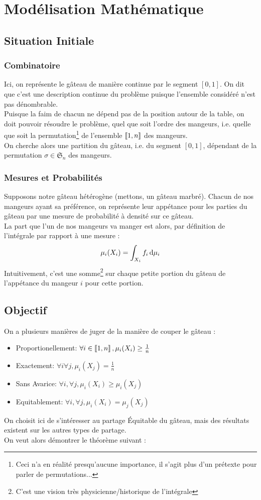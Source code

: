 \documentclass{cours}
\begin{document}
\section{Modélisation Mathématique}
\subsection{Situation Initiale}
\subsubsection{Combinatoire}
Ici, on représente le gâteau de manière continue par le segment $\left[0, 1\right]$. On dit que c'est une description continue du problème puisque l'ensemble considéré n'est pas dénombrable.\\
Puisque la faim de chacun ne dépend pas de la position autour de la table, on doit pouvoir résoudre le problème, quel que soit l'ordre des mangeurs, i.e. quelle que soit la permutation\footnote{Ceci n'a en réalité presqu'aucune importance, il s'agit plus d'un prétexte pour parler de permutations...} de l'ensemble $\left\llbracket 1, n\right\rrbracket$ des mangeurs. \\
On cherche alors une partition du gâteau, i.e. du segment $\left[0, 1\right]$, dépendant de la permutation $\sigma \in \mathfrak{S}_{n}$ des mangeurs.

\subsubsection{Mesures et Probabilités}
Supposons notre gâteau hétérogène (mettons, un gâteau marbré). Chacun de nos mangeurs ayant sa préférence, on représente leur appétance pour les parties du gâteau par une mesure de probabilité à densité sur ce gâteau.\\
La part que l'un de nos mangeurs va manger est alors, par définition de l'intégrale par rapport à une mesure :
\[
    \mu_{i}(X_{i}) = \int_{X_{i}}f_{i} {\rm \, d}\mu_{i}
\]
Intuitivement, c'est une somme\footnote{C'est une vision très physicienne/historique de l'intégrale} sur chaque petite portion du gâteau de l'appétance du mangeur $i$ pour cette portion.

\subsection{Objectif}
On a plusieurs manières de juger de la manière de couper le gâteau :
\begin{itemize}
    \item Proportionellement: $\forall i \in \left\llbracket 1, n\right\rrbracket, \mu_{i}(X_{i}) \geq \frac{1}{n}$
    \item Exactement: $\forall i \forall j, \mu_{i}(X_{j}) = \frac{1}{n}$
    \item Sans Avarice: $\forall i, \forall j, \mu_{i}(X_{i}) \geq \mu_{i}(X_{j})$
    \item Equitablement: $\forall i, \forall j, \mu_{i}(X_{i}) = \mu_{j}(X_{j})$
\end{itemize}
On choisit ici de s'intéresser au partage Équitable du gâteau, mais des résultats existent sur les autres types de partage.\\
On veut alors démontrer le théorème suivant :
\end{document}
